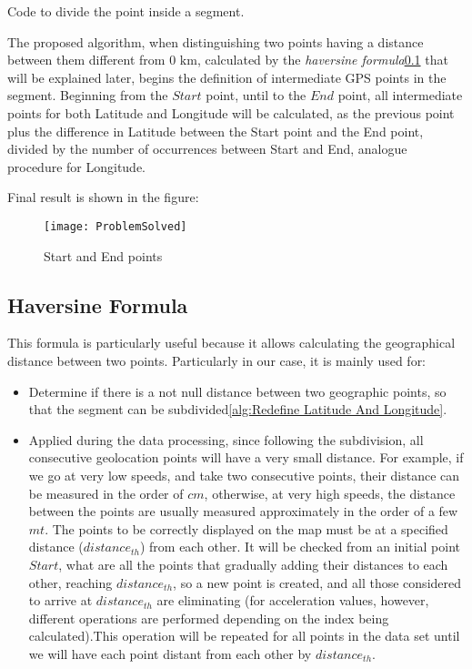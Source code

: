 \documentclass[tesi]{subfiles}
\begin{document}
\begin{center}
Code to divide the point inside a segment.
\end{center}
The proposed algorithm, when distinguishing two points having a distance between them different from $0$ $\si{\km}$, calculated by the \textit{haversine formula}\ref{ssc:Haversine Formula} that will be explained later, begins the definition of intermediate GPS points in the segment.
Beginning from the $Start$ point, until to the $End$ point, all intermediate points for both Latitude and Longitude will be calculated, as the previous point plus the difference in Latitude between the Start point and the End point, divided by the number of occurrences between Start and End, analogue procedure for Longitude.

Final result is shown in the figure:

\begin{figure}[H]	
\centering
\texttt{[image: ProblemSolved]} \label{Solved GPS Points Problem}
 \caption{Start and End points}
  \label{fig:Solved GPS Points Problem}
\end{figure}

\subsection{Haversine Formula} \label{ssc:Haversine Formula}
This formula is particularly useful because it allows calculating the geographical distance between two points. Particularly in our case, it is mainly used for:
\begin{itemize}
\item Determine if there is a not null distance between two geographic points, so that the segment can be subdivided\ref{alg:Redefine Latitude And Longitude}.
\item Applied during the data processing, since following the subdivision, all consecutive geolocation points will have a very small distance.
For example, if we go at very low speeds, and take two consecutive points, their distance can be measured in the order of $cm$, otherwise, at very high speeds, the distance between the points are usually measured approximately in the order of a few $mt$.
The points to be correctly displayed on the map must be at a specified distance ($distance_{th}$) from each other.
It will be checked from an initial point $Start$, what are all the points that gradually adding their distances to each other, reaching $distance_{th}$, so a new point is created, and all those considered to arrive at $distance_{th}$ are eliminating (for acceleration values, however, different operations are performed depending on the index being calculated).This operation will be repeated for all points in the data set until we will have each point distant from each other by $distance_{th}$.
\end{itemize}
\end{document}
